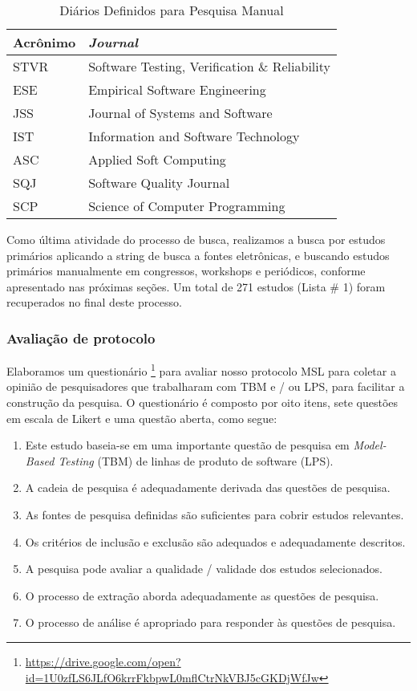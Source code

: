 \begin{table}[!h]
	\centering
	\scriptsize
	\caption{Diários Definidos para Pesquisa Manual}
	\label{table:journals}
	\begin{tabular}{l|l}
		\hline \hline
		\textbf{Acrônimo} & \textbf{\textit{Journal}}                    \\\hline
		STVR					 & Software Testing, Verification \& Reliability \\\hline
		ESE            & Empirical Software Engineering      \\\hline
		JSS            & Journal of Systems and Software     \\\hline
		IST            & Information and Software Technology \\\hline
		ASC            & Applied Soft Computing              \\\hline
		SQJ            & Software Quality Journal            \\\hline
		SCP            & Science of Computer Programming     \\\hline
		\hline
	\end{tabular}
\end{table}

Como última atividade do processo de busca, realizamos a busca por estudos primários aplicando a string de busca a fontes eletrônicas, e buscando estudos primários manualmente em congressos, workshops e periódicos, conforme apresentado nas próximas seções. Um total de 271 estudos (Lista \# 1) foram recuperados no final deste processo.

\subsubsection{Avaliação de protocolo}

Elaboramos um questionário \footnote{\url{https://drive.google.com/open?id=1U0zfLS6JLfO6krrFkbpwL0mflCtrNkVBJ5cGKDjWfJw}} para avaliar nosso protocolo MSL para coletar a opinião de pesquisadores que trabalharam com TBM e / ou LPS, para facilitar a construção da pesquisa. O questionário é composto por oito itens, sete questões em escala de Likert \cite{li2013novel} e uma questão aberta, como segue:

\begin{enumerate}
	\item Este estudo baseia-se em uma importante questão de pesquisa em \textit{Model-Based Testing} (TBM) de linhas de produto de software (LPS).
	\item A cadeia de pesquisa é adequadamente derivada das questões de pesquisa.
	\item As fontes de pesquisa definidas são suficientes para cobrir estudos relevantes.
	\item Os critérios de inclusão e exclusão são adequados e adequadamente descritos.
	\item A pesquisa pode avaliar a qualidade / validade dos estudos selecionados.
	\item O processo de extração aborda adequadamente as questões de pesquisa.
	\item O processo de análise é apropriado para responder às questões de pesquisa.
\end{enumerate}

